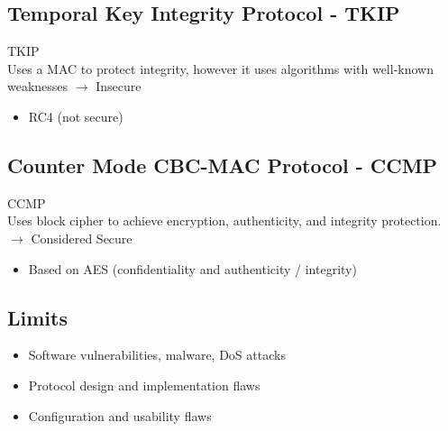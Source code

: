 \subsection{Temporal Key Integrity Protocol - TKIP}

\begin{definition}{TKIP}\\
    Uses a MAC to protect integrity, however it uses algorithms with well-known weaknesses $\rightarrow$ Insecure
    \begin{itemize}
        \item RC4 (not secure)
    \end{itemize}
\end{definition}

\subsection{Counter Mode CBC-MAC Protocol - CCMP}

\begin{definition}{CCMP}\\
    Uses block cipher to achieve encryption, authenticity, and integrity protection. $\rightarrow$ Considered Secure
    \begin{itemize}
        \item Based on AES (confidentiality and authenticity / integrity)
    \end{itemize}
\end{definition}


\subsection{Limits}

\begin{remark}
    \begin{itemize}
        \item Software vulnerabilities, malware, DoS attacks
        \item Protocol design and implementation flaws
        \item Configuration and usability flaws
    \end{itemize}
\end{remark}